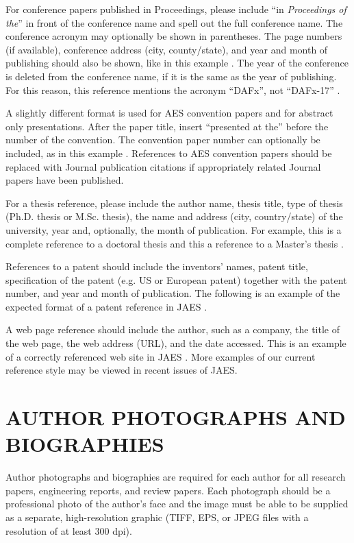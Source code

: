 \documentclass[fleqn]{jaes}
\begin{document}
For conference papers published in Proceedings, please include “in \emph{Proceedings of the}” in front of the conference name and spell out the full conference name. The conference acronym may optionally be shown in parentheses. The page numbers (if available), conference address (city, county/state), and year and month of publishing should also be shown, like in this example \cite{a_conference_paper}. The year of the conference is deleted from the conference name, if it is the same as the year of publishing. For this reason, this reference mentions the acronym “DAFx”, not “DAFx-17” \cite{a_conference_paper}. 

A slightly different format is used for AES convention papers and for abstract only presentations. After the paper title, insert “presented at the” before the number of the convention. The convention paper number can optionally be included, as in this example \cite{AES_convention_paper}. References to AES convention papers should be replaced with Journal publication citations if appropriately related Journal papers have been published.

For a thesis reference, please include the author name, thesis title, type of thesis (Ph.D. thesis or M.Sc. thesis), the name and address (city, country/state) of the university, year and, optionally, the month of publication. For example, this is a complete reference to a doctoral thesis \cite{a_PhD_thesis} and this a reference to a Master's thesis \cite{an_MSc_thesis}. 

References to a patent should include the inventors’ names, patent title, specification of the patent (e.g. US or European patent) together with the patent number, and year and month of publication. The following is an example of the expected format of a patent reference in JAES \cite{a_patent}. 

A web page reference should include the author, such as a company, the title of the web page, the web address (URL), and the date accessed. This is an example of a correctly referenced web site in JAES \cite{a_web_page}. More examples of our current reference style may be viewed in recent issues of JAES.

\section{AUTHOR PHOTOGRAPHS AND BIOGRAPHIES}
Author photographs and biographies are required for each author for all research papers, engineering reports, and review papers. Each photograph should be a professional photo of the author’s face and the image must be able to be supplied as a separate, high-resolution graphic (TIFF, EPS, or JPEG files with a resolution of at least 300 dpi). 
\end{document}
